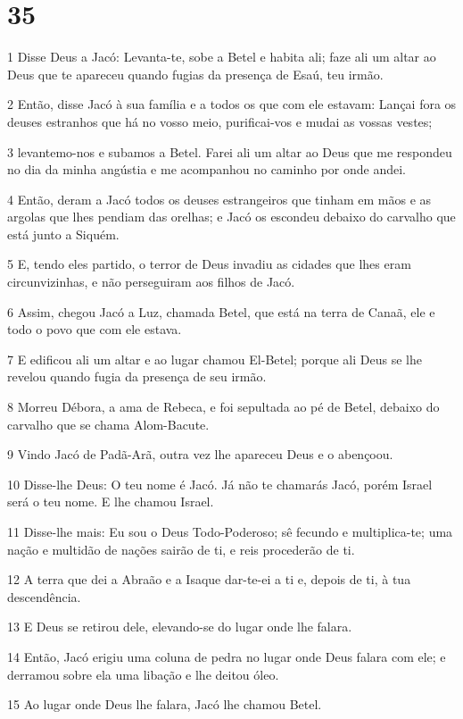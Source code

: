 \chapter{35}

\par 1 Disse Deus a Jacó: Levanta-te, sobe a Betel e habita ali; faze ali um altar ao Deus que te apareceu quando fugias da presença de Esaú, teu irmão.
\par 2 Então, disse Jacó à sua família e a todos os que com ele estavam: Lançai fora os deuses estranhos que há no vosso meio, purificai-vos e mudai as vossas vestes;
\par 3 levantemo-nos e subamos a Betel. Farei ali um altar ao Deus que me respondeu no dia da minha angústia e me acompanhou no caminho por onde andei.
\par 4 Então, deram a Jacó todos os deuses estrangeiros que tinham em mãos e as argolas que lhes pendiam das orelhas; e Jacó os escondeu debaixo do carvalho que está junto a Siquém.
\par 5 E, tendo eles partido, o terror de Deus invadiu as cidades que lhes eram circunvizinhas, e não perseguiram aos filhos de Jacó.
\par 6 Assim, chegou Jacó a Luz, chamada Betel, que está na terra de Canaã, ele e todo o povo que com ele estava.
\par 7 E edificou ali um altar e ao lugar chamou El-Betel; porque ali Deus se lhe revelou quando fugia da presença de seu irmão.
\par 8 Morreu Débora, a ama de Rebeca, e foi sepultada ao pé de Betel, debaixo do carvalho que se chama Alom-Bacute.
\par 9 Vindo Jacó de Padã-Arã, outra vez lhe apareceu Deus e o abençoou.
\par 10 Disse-lhe Deus: O teu nome é Jacó. Já não te chamarás Jacó, porém Israel será o teu nome. E lhe chamou Israel.
\par 11 Disse-lhe mais: Eu sou o Deus Todo-Poderoso; sê fecundo e multiplica-te; uma nação e multidão de nações sairão de ti, e reis procederão de ti.
\par 12 A terra que dei a Abraão e a Isaque dar-te-ei a ti e, depois de ti, à tua descendência.
\par 13 E Deus se retirou dele, elevando-se do lugar onde lhe falara.
\par 14 Então, Jacó erigiu uma coluna de pedra no lugar onde Deus falara com ele; e derramou sobre ela uma libação e lhe deitou óleo.
\par 15 Ao lugar onde Deus lhe falara, Jacó lhe chamou Betel.
